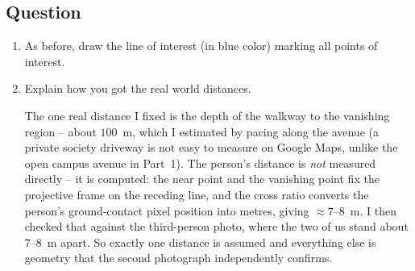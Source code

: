 \subsection{Question}
\begin{enumerate}

\item As before, draw the line of interest (in blue color) marking all points of interest. 
  
\item Explain how you got the real world distances.
\begin{studentSpace}
\noindent The one real distance I fixed is the depth of the walkway to
the vanishing region -- about $100$~m, which I estimated by pacing along
the avenue (a private society driveway is not easy to measure on Google
Maps, unlike the open campus avenue in Part~1). The person's distance
is \emph{not} measured directly -- it is computed: the near point and the
vanishing point fix the projective frame on the receding line, and the
cross ratio converts the person's ground-contact pixel position into
metres, giving $\approx 7$--$8$~m. I then checked that against the
third-person photo, where the two of us stand about $7$--$8$~m apart. So
exactly one distance is assumed and everything else is geometry that the
second photograph independently confirms.
\end{studentSpace}


\end{enumerate}

